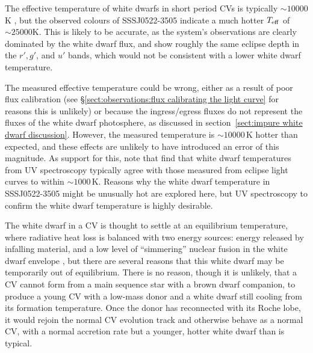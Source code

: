The effective temperature of white dwarfs in short period CVs is typically $\sim10000$K \citep{Pala2017a}, but the observed colours of SSSJ0522-3505 indicate a much hotter $T_{\rm eff}$ of $\sim25000$K. This is likely to be accurate, as the system's observations are clearly dominated by the white dwarf flux, and show roughly the same eclipse depth in the $r', g'$, and $u'$ bands, which would not be consistent with a lower white dwarf temperature.

The measured effective temperature could be wrong, either as a result of poor flux calibration (see \S\ref{sect:observations:flux calibrating the light curve} for reasons this is unlikely) or because the ingress/egress fluxes do not represent the fluxes of the white dwarf photosphere, as discussed in section~\ref{sect:impure white dwarf discussion}. However, the measured temperature is  $\sim10000$\,K hotter than expected, and these effects are unlikely to have introduced an error of this magnitude. As support for this, note that \citet{Pala2017a} find that white dwarf temperatures from UV spectroscopy typically agree with those measured from eclipse light curves to within $\sim1000$\,K. Reasons why the white dwarf temperature in SSSJ0522-3505 might be unusually hot are explored here, but UV spectroscopy to confirm the white dwarf temperature is highly desirable.

The white dwarf in a CV is thought to settle at an equilibrium temperature, where radiative heat loss is balanced with two energy sources: energy released by infalling material, and a low level of ``simmering'' nuclear fusion in the white dwarf envelope \citep{Townsley2003, Townsley2004}, but there are several reasons that this white dwarf may be temporarily out of equilibrium.
There is no reason, though it is unlikely, that a CV cannot form from a main sequence star with a brown dwarf companion, to produce a young CV with a low-mass donor and a white dwarf still cooling from its formation temperature.
Once the donor has reconnected with its Roche lobe, it would rejoin the normal CV evolution track and otherwise behave as a normal CV, with a normal accretion rate but a younger, hotter white dwarf than is typical.

